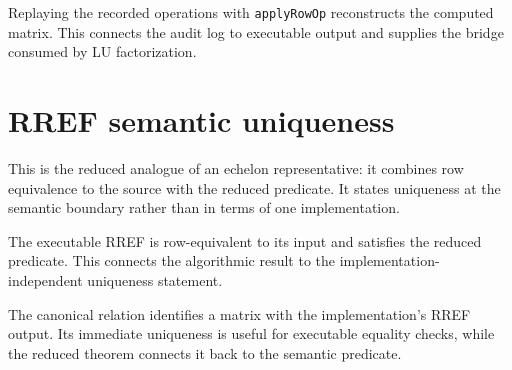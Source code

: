 \begin{theorem}
\label{thm:operation-log-replay}
\leanok
{}
Replaying the recorded operations with \texttt{applyRowOp} reconstructs the computed matrix.
This connects the audit log to executable output and supplies the bridge consumed by LU
factorization.
\end{theorem}

\chapter{RREF semantic uniqueness}

\begin{definition}
\label{def:reduced-echelon-representative}
\leanok
{}
This is the reduced analogue of an echelon representative: it combines row equivalence to the
source with the reduced predicate.  It states uniqueness at the semantic boundary rather than
in terms of one implementation.
\end{definition}

\begin{theorem}
\label{thm:algorithmic-rref-representative}
\leanok
{}
The executable RREF is row-equivalent to its input and satisfies the reduced predicate.  This
connects the algorithmic result to the implementation-independent uniqueness statement.
\end{theorem}

\begin{definition}
\label{def:canonical-rref}
\leanok
{}
The canonical relation identifies a matrix with the implementation's RREF output.  Its immediate
uniqueness is useful for executable equality checks, while the reduced theorem connects it back
to the semantic predicate.
\end{definition}

